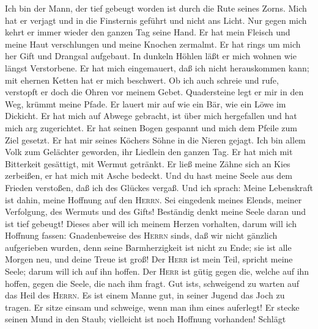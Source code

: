  Ich bin der Mann, der tief gebeugt worden ist durch die
Rute seines Zorns.  Mich hat er verjagt und in die
Finsternis geführt und nicht ans Licht.  Nur gegen mich
kehrt er immer wieder den ganzen Tag seine Hand.  Er hat
mein Fleisch und meine Haut verschlungen und meine Knochen zermalmt.
 Er hat rings um mich her Gift und Drangsal aufgebaut.
 In dunkeln Höhlen läßt er mich wohnen wie längst
Verstorbene.  Er hat mich eingemauert, daß ich nicht
herauskommen kann; mit ehernen Ketten hat er mich beschwert.
 Ob ich auch schreie und rufe, verstopft er doch die Ohren
vor meinem Gebet.  Quadersteine legt er mir in den Weg,
krümmt meine Pfade.  Er lauert mir auf wie ein Bär, wie
ein Löwe im Dickicht.  Er hat mich auf Abwege gebracht,
ist über mich hergefallen und hat mich arg zugerichtet. 
Er hat seinen Bogen gespannt und mich dem Pfeile zum Ziel gesetzt.
 Er hat mir seines Köchers Söhne in die Nieren gejagt.
 Ich bin allem Volk zum Gelächter geworden, ihr Liedlein
den ganzen Tag.  Er hat mich mit Bitterkeit gesättigt,
mit Wermut getränkt.  Er ließ meine Zähne sich an Kies
zerbeißen, er hat mich mit Asche bedeckt.  Und du hast
meine Seele aus dem Frieden verstoßen, daß ich des Glückes vergaß.
 Und ich sprach: Meine Lebenskraft ist dahin, meine
Hoffnung auf den \textsc{Herrn}.  Sei eingedenk meines
Elends, meiner Verfolgung, des Wermuts und des Gifts! 
Beständig denkt meine Seele daran und ist tief gebeugt! 
Dieses aber will ich meinem Herzen vorhalten, darum will ich Hoffnung
fassen:  Gnadenbeweise des \textsc{Herrn}
sind\textquotesingle s, daß wir nicht gänzlich aufgerieben wurden, denn
seine Barmherzigkeit ist nicht zu Ende;  sie ist alle
Morgen neu, und deine Treue ist groß!  Der \textsc{Herr}
ist mein Teil, spricht meine Seele; darum will ich auf ihn hoffen.
 Der \textsc{Herr} ist gütig gegen die, welche auf ihn
hoffen, gegen die Seele, die nach ihm fragt.  Gut
ist\textquotesingle s, schweigend zu warten auf das Heil des
\textsc{Herrn}.  Es ist einem Manne gut, in seiner Jugend
das Joch zu tragen.  Er sitze einsam und schweige, wenn
man ihm eines auferlegt!  Er stecke seinen Mund in den
Staub; vielleicht ist noch Hoffnung vorhanden!  Schlägt
